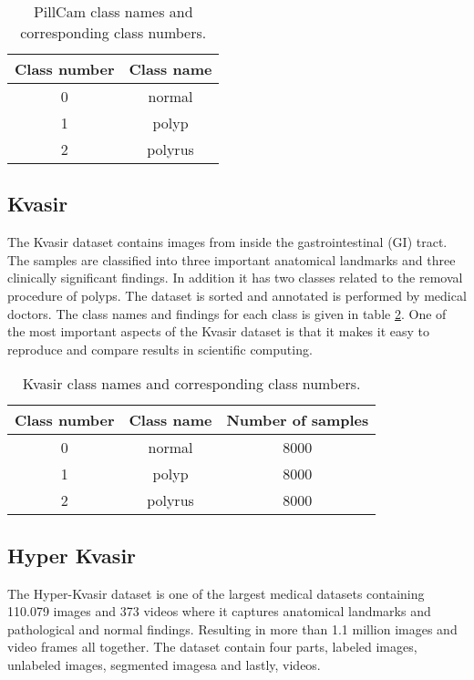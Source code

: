 \documentclass[thesis.tex]{subfiles}
\begin{document}
\begin{table}
  \centering
  \begin{tabular}{ |c|c| }
  	\hline
  	Class number & Class name \\
    \hline
    0 & normal \\ 
    1 & polyp \\ 
    2 & polyrus \\ 
    \hline
  \end{tabular}
  \caption{PillCam class names and corresponding class numbers.}
  \label{table:kvasir_pillcam}
\end{table}


\subsection{Kvasir} \label{kvasir}
The Kvasir dataset \cite{KVASIRMultiClass17} contains images from inside the gastrointestinal (GI) tract. The samples are classified into three important anatomical landmarks and three clinically significant findings. In addition it has two classes related to the removal procedure of polyps. The dataset is sorted and annotated is performed by medical doctors. The class names and findings for each class is given in table \ref{table:kvasir}. One of the most important aspects of the Kvasir dataset is that it makes it easy to reproduce and compare results in scientific computing.

\begin{table}
  \centering
  \begin{tabular}{ |c|c|c| }
  	\hline
  	Class number & Class name & Number of samples \\
    \hline
    0 & normal & 8000 \\ 
    1 & polyp & 8000 \\ 
    2 & polyrus & 8000 \\ 
    \hline
  \end{tabular}
  \caption{Kvasir class names and corresponding class numbers.}
  \label{table:kvasir}
\end{table}


\subsection{Hyper Kvasir} \label{hyper_kvasir}
The Hyper-Kvasir dataset is one of the largest medical datasets containing 110.079 images and 373 videos where it captures anatomical landmarks and pathological and normal findings. Resulting in more than 1.1 million images and video frames all together. The dataset contain four parts, labeled images, unlabeled images, segmented imagesa and lastly, videos.
\end{document}
